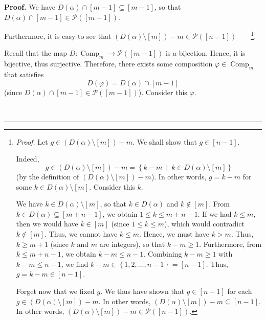 \documentclass[numbers=enddot,12pt,final,onecolumn,notitlepage]{scrartcl}%
\theoremstyle{definition}
\newenvironment{proof}[1][Proof]{\noindent\textbf{#1.} }{\ \rule{0.5em}{0.5em}}
\begin{document}
\begin{proof}
We have $D\left(  \alpha\right)  \cap\left[  m-1\right]  \subseteq\left[
m-1\right]  $, so that $D\left(  \alpha\right)  \cap\left[  m-1\right]
\in\mathcal{P}\left(  \left[  m-1\right]  \right)  $.

Furthermore, it is easy to see that $\left(  D\left(  \alpha\right)
\setminus\left[  m\right]  \right)  -m\in\mathcal{P}\left(  \left[
n-1\right]  \right)  $\ \ \ \ \footnote{\textit{Proof.} Let $g\in\left(
D\left(  \alpha\right)  \setminus\left[  m\right]  \right)  -m$. We shall show
that $g\in\left[  n-1\right]  $.
\par
Indeed,%
\[
g\in\left(  D\left(  \alpha\right)  \setminus\left[  m\right]  \right)
-m=\left\{  k-m\ \mid\ k\in D\left(  \alpha\right)  \setminus\left[  m\right]
\right\}
\]
(by the definition of $\left(  D\left(  \alpha\right)  \setminus\left[
m\right]  \right)  -m$). In other words, $g=k-m$ for some $k\in D\left(
\alpha\right)  \setminus\left[  m\right]  $. Consider this $k$.
\par
We have $k\in D\left(  \alpha\right)  \setminus\left[  m\right]  $, so that
$k\in D\left(  \alpha\right)  $ and $k\notin\left[  m\right]  $. From $k\in
D\left(  \alpha\right)  \subseteq\left[  m+n-1\right]  $, we obtain $1\leq
k\leq m+n-1$. If we had $k\leq m$, then we would have $k\in\left[  m\right]  $
(since $1\leq k\leq m$), which would contradict $k\notin\left[  m\right]  $.
Thus, we cannot have $k\leq m$. Hence, we must have $k>m$. Thus, $k\geq m+1$
(since $k$ and $m$ are integers), so that $k-m\geq1$. Furthermore, from $k\leq
m+n-1$, we obtain $k-m\leq n-1$. Combining $k-m\geq1$ with $k-m\leq n-1$, we
find $k-m\in\left\{  1,2,\ldots,n-1\right\}  =\left[  n-1\right]  $. Thus,
$g=k-m\in\left[  n-1\right]  $.
\par
Forget now that we fixed $g$. We thus have shown that $g\in\left[  n-1\right]
$ for each $g\in\left(  D\left(  \alpha\right)  \setminus\left[  m\right]
\right)  -m$. In other words, $\left(  D\left(  \alpha\right)  \setminus
\left[  m\right]  \right)  -m\subseteq\left[  n-1\right]  $. In other words,
$\left(  D\left(  \alpha\right)  \setminus\left[  m\right]  \right)
-m\in\mathcal{P}\left(  \left[  n-1\right]  \right)  $.}.

Recall that the map $D:\operatorname*{Comp}\nolimits_{m}\rightarrow
\mathcal{P}\left(  \left[  m-1\right]  \right)  $ is a bijection. Hence, it is
bijective, thus surjective. Therefore, there exists some composition
$\varphi\in\operatorname*{Comp}\nolimits_{m}$ that satisfies%
\begin{equation}
D\left(  \varphi\right)  =D\left(  \alpha\right)  \cap\left[  m-1\right]
\label{pf.prop.concat.4.Dphi}%
\end{equation}
(since $D\left(  \alpha\right)  \cap\left[  m-1\right]  \in\mathcal{P}\left(
\left[  m-1\right]  \right)  $). Consider this $\varphi$.


\end{proof}
\end{document}
